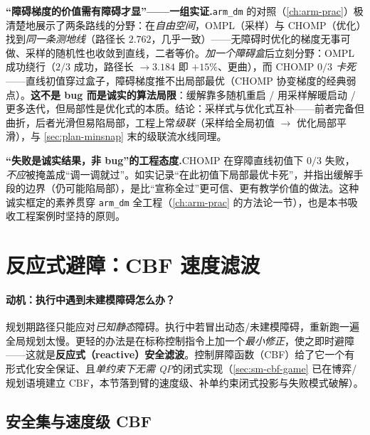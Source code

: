 \begin{insight}
\textbf{“障碍梯度的价值需有障碍才显”——一组实证.}\;\texttt{arm\_dm} 的对照（\cref{ch:arm-prac}）极清楚地展示了两条路线的分野：在\emph{自由空间}，OMPL（采样）与 CHOMP（优化）找到\emph{同一条测地线}（路径长 $2.762$，几乎一致）——无障碍时优化的梯度无事可做、采样的随机性也收敛到直线，二者等价。\emph{加一个障碍盒}后立刻分野：OMPL 成功绕行（$2/3$ 成功，路径长 $\to 3.184$ 即 $+15\%$、更曲），而 CHOMP \emph{$0/3$ 卡死}——直线初值穿过盒子，障碍梯度推不出局部最优（CHOMP 协变梯度的经典弱点）。\textbf{这不是 bug 而是诚实的算法局限}：缓解靠多随机重启 / 用采样解暖启动 / 更多迭代，但局部性是优化式的本质。结论：采样式与优化式互补——前者完备但曲折，后者光滑但易陷局部，工程上常\emph{级联}（采样给全局初值 $\to$ 优化局部平滑），与 \cref{sec:plan-minsnap} 末的级联流水线同理。
\end{insight}

\begin{note}
\textbf{“失败是诚实结果，非 bug”的工程态度.}\;CHOMP 在穿障直线初值下 $0/3$ 失败，\emph{不应}被掩盖成“调一调就过”。如实记录“在此初值下局部最优卡死”，并指出缓解手段的边界（仍可能陷局部），是比“宣称全过”更可信、更有教学价值的做法。这种诚实框定的素养贯穿 \texttt{arm\_dm} 全工程（\cref{ch:arm-prac} 的方法论一节），也是本书吸收工程案例时坚持的原则。
\end{note}

\section{反应式避障：CBF 速度滤波}
\label{sec:at-cbf}

\paragraph{动机：执行中遇到未建模障碍怎么办？}
规划期路径只能应对\emph{已知静态}障碍。执行中若冒出动态/未建模障碍，重新跑一遍全局规划太慢。更轻的办法是在标称控制指令上加一个\emph{最小修正}，使之即时避障——这就是\textbf{反应式（reactive）安全滤波}。控制屏障函数（CBF）给了它一个有形式化安全保证、且\emph{单约束下无需 QP}的闭式实现（\cref{sec:sm-cbf-game} 已在博弈/规划语境建立 CBF，本节落到臂的速度级、补单约束闭式投影与失败模式破解）。

\subsection{安全集与速度级 CBF}
\label{subsec:at-cbf-def}

